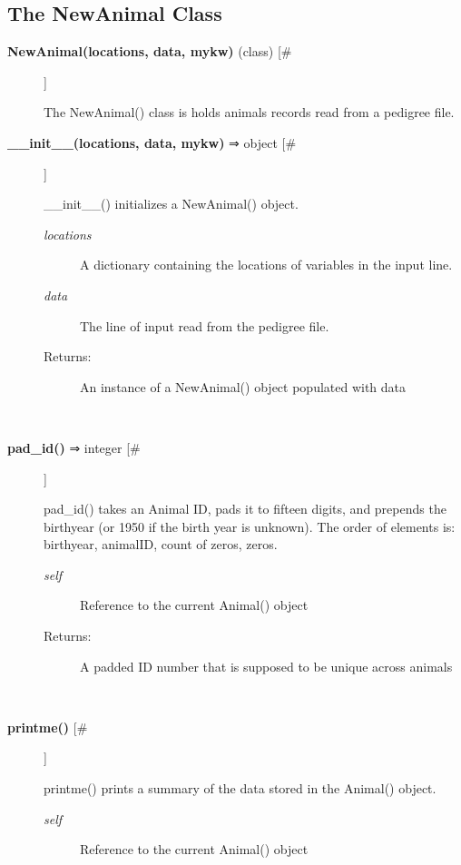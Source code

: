 \documentclass[10pt]{article}
\begin{document}
\subsection*{The NewAnimal Class}
\begin{description}
\item[\textbf{NewAnimal(locations, data, mykw)}
 (class) [\#]]

 The NewAnimal() class is holds animals records read from a pedigree file.

\item[\textbf{\_\_init\_\_(locations, data, mykw)}
 ⇒ object [\#]]

 \_\_init\_\_() initializes a NewAnimal() object.
\begin{description}
\item[\emph{locations}
] A dictionary containing the locations of variables in the input line.
\item[\emph{data}
] The line of input read from the pedigree file.
\item[Returns:] An instance of a NewAnimal() object populated with data

\end{description}
\\ 

\item[\textbf{pad\_id()}
 ⇒ integer [\#]]

 pad\_id() takes an Animal ID, pads it to fifteen digits, and prepends the birthyear (or 1950 if the birth year is unknown). The order of elements is: birthyear, animalID, count of zeros, zeros.
\begin{description}
\item[\emph{self}
] Reference to the current Animal() object
\item[Returns:] A padded ID number that is supposed to be unique across animals

\end{description}
\\ 

\item[\textbf{printme()}
 [\#]]

 printme() prints a summary of the data stored in the Animal() object.
\begin{description}
\item[\emph{self}
] Reference to the current Animal() object

\end{description}
\\ 


\end{description}
\end{document}
